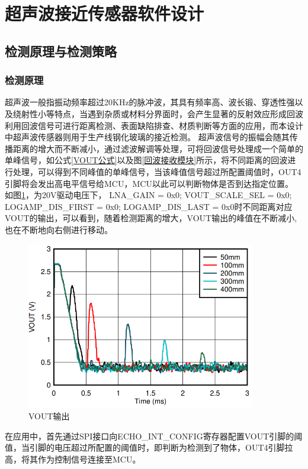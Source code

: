     \newpage
	\section{超声波接近传感器软件设计}
    \subsection{检测原理与检测策略}
    

    
    \subsubsection{检测原理}
    超声波一般指振动频率超过20KHz的脉冲波，其具有频率高、波长锻、穿透性强以及绕射性小等特点，当遇到杂质或材料分界面时，会产生显著的反射效应形成回波利用回波信号可进行距离检测、表面缺陷排查、材质判断等方面的应用，而本设计中超声波传感器则用于生产线钢化玻璃的接近检测。
    超声波信号的振幅会随其传播距离的增大而不断减小，通过滤波解调等处理，可将回波信号处理成一个简单的单峰信号，如公式\ref{VOUT公式}以及图\ref{回波接收模块}所示，将不同距离的回波进行处理，可以得到不同峰值的单峰信号，当该峰值信号超过所配置阈值时，OUT4引脚将会发出高电平信号给MCU，MCU以此可以判断物体是否到达指定位置。
    如图\ref{VOUT输出}，为20V驱动电压下， LNA\_GAIN = 0x0; VOUT\_SCALE\_SEL = 0x0; 
LOGAMP\_DIS\_FIRST = 0x0; LOGAMP\_DIS\_LAST = 0x0时不同距离对应VOUT的输出，可以看到，随着检测距离的增大，VOUT输出的峰值在不断减小,也在不断地向右侧进行移动。\par
    \begin{figure}[ht]
        \centering
        \includegraphics[width=10cm]{figure/VOUT image.png}
        \caption{VOUT输出}
        \label{VOUT输出}
    \end{figure}
    在应用中，首先通过SPI接口向ECHO\_INT\_CONFIG寄存器配置VOUT引脚的阈值，当引脚的电压超过所配置的阈值时，即判断为检测到了物体，OUT4引脚拉高，将其作为控制信号连接至MCU。\par
